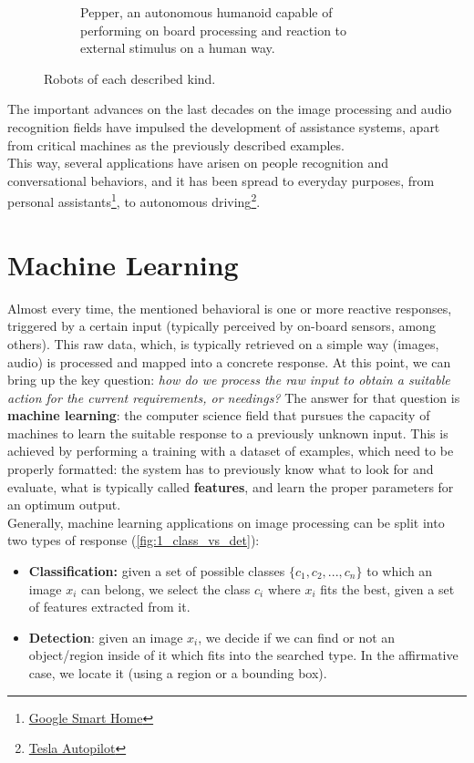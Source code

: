 \begin{figure}[h]
\begin{subfigure}[b]{0.4\textwidth}
			\caption{Pepper, an autonomous humanoid capable of performing on board processing and reaction to external stimulus on a human way.}
			\label{fig:1_pepper}
		\end{subfigure}
		\caption{Robots of each described kind.}
		\label{fig:1_robots}
		
	\end{figure}

The important advances on the last decades on the image processing and audio recognition fields have impulsed the development of assistance systems, apart from critical machines as the previously described examples. \\

This way, several applications have arisen on people recognition and conversational behaviors, and it has been spread to everyday purposes, from personal assistants\footnote{\href{https://www.standard.co.uk/tech/google-smart-home-future-stay-a3868591.html}{Google Smart Home}}, to autonomous driving\footnote{\href{https://electrek.co/2018/06/18/what-tesla-autopilot-see-understand/}{Tesla Autopilot}}.\\

\section{Machine Learning}
Almost every time, the mentioned behavioral is one or more reactive responses, triggered by a certain input (typically perceived by on-board sensors, among others). This raw data, which, is typically retrieved on a simple way (images, audio) is processed and mapped into a concrete response. At this point, we can bring up the key question: \emph{how do we process the raw input to obtain a suitable action for the current requirements, or needings?} The answer for that question is \textbf{machine learning}: the computer science field that pursues the capacity of machines to learn the suitable response to a previously unknown input. This is achieved by performing a training with a dataset of examples, which need to be properly formatted: the system has to previously know what to look for and evaluate, what is typically called \textbf{features}, and learn the proper parameters for an optimum output.\\

Generally, machine learning applications on image processing can be split into two types of response (\autoref{fig:1_class_vs_det}):

\begin{itemize}
	\item \textbf{Classification:} given a set of possible classes $\{c_1, c_2, ..., c_n\}$ to which an image $x_i$ can belong, we select the class $c_i$ where $x_i$ fits the best, given a set of features extracted from it.
	\item \textbf{Detection}: given an image $x_i$, we decide if we can find or not an object/region inside of it which fits into the searched type. In the affirmative case, we locate it (using a region or a bounding box).
\end{itemize}

